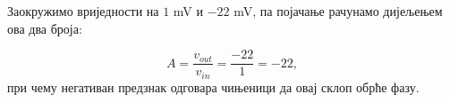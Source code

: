 Заокружимо вриједности на $1$ mV и $-22$ mV, па појачање рачунамо дијељењем ова два броја: 

\begin{equation}
A = \frac{v_{out}}{v_{in}} = \frac{-22}{1} = -22,
\end{equation}
при чему негативан предзнак одговара чињеници да овај склоп обрће фазу.


\section*{}


